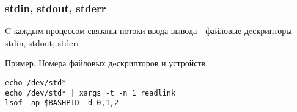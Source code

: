\begin{frame}[fragile]
	\frametitle{stdin, stdout, stderr}
     C каждым процессом связаны потоки ввода-вывода - файловые дeскрипторы stdin, stdout, stderr.
    \begin{block}{Пример. Номера файловых дeскрипторов и устройств. }
                    \begin{lstlisting}
echo /dev/std*
echo /dev/std* | xargs -t -n 1 readlink
lsof -ap $BASHPID -d 0,1,2
                    \end{lstlisting}
    \end{block}
\end{frame}

